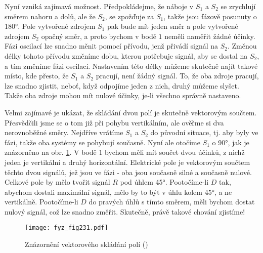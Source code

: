     Nyní vzniká zajímavá možnost. Předpokládejme, že náboje v \(S_1\) a \(S_2\) se zrychlují směrem 
    nahoru a dolů, ale že \(S_2\), se zpožďuje za \(S_1\), takže jsou fázově posunuty o \ang{180}. 
    Pole vytvořené zdrojem \(S_1\) pak bude mít jeden směr a pole vytvořené zdrojem \(S_2\) opačný 
    směr, a proto bychom v bodě \(1\) neměli naměřit žádné účinky. Fázi oscilací lze snadno měnit 
    pomocí přívodu, jenž přivádí signál na \(S_2\). Změnou délky tohoto přívodu změníme dobu, 
    kterou potřebuje signál, aby se dostal na \(S_2\), a tím změníme fázi oscilací. Nastavením této 
    délky můžeme skutečně najít takové místo, kde přesto, že \(S_1\) a \(S_2\) pracují, není žádný 
    signál. To, že oba zdroje pracují, lze snadno zjistit, neboť, když odpojíme jeden z nich, druhý 
    můžeme slyšet. Takže oba zdroje mohou mít nulové účinky, je-li všechno správně nastaveno.
    
    Velmi zajímavé je ukázat, že skládání dvou polí je skutečně vektorovým součtem. Přesvědčili 
    jsme se o tom již při pohybu vertikálním, ale ověřme si dva nerovnoběžné směry. Nejdříve 
    vrátíme \(S_1\) a \(S_2\) do původní situace, tj. aby byly ve fázi, takže oba systémy se 
    pohybují současně. Nyní ale otočíme \(S_1\) o \ang{90}, jak je znázorněno na obr. 
    \ref{fyz:fig231}. V bodě \(1\) bychom měli mít součet dvou účinků, z nichž jeden je vertikální 
    a druhý horizontální. Elektrické pole je vektorovým součtem těchto dvou signálů, jež jsou ve 
    fázi - oba jsou současně silné a současně nulové. Celkové pole by mělo tvořit signál \(R\) pod 
    úhlem \ang{45}. Pootočíme-li \(D\) tak, abychom dostali maximální signál, mělo by to být v úhlu 
    kolem \ang{45}, a ne vertikálně. Pootočíme-li \(D\) do pravých úhlů s tímto směrem, měli bychom 
    dostat nulový signál, což lze snadno změřit. Skutečně, právě takové chování zjistíme!
    
    \begin{figure}[ht!] %
      \centering
      \texttt{[image: fyz\_fig231.pdf]}
      \caption{Znázornění vektorového skládání polí
               (\cite[s.~377]{Feynman01})}
      \label{fyz:fig231}
    \end{figure}
    
